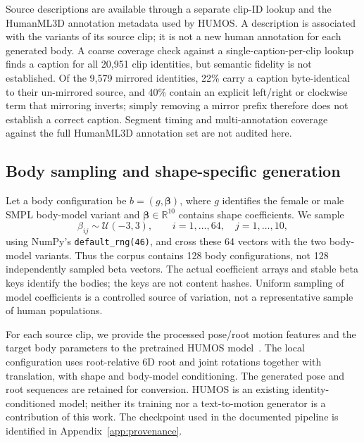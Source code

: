 \documentclass[11pt]{article}
\newcommand{\R}{\mathbb{R}}
\begin{document}
Source descriptions are available through a separate clip-ID lookup and the
HumanML3D annotation metadata used by HUMOS. A description is associated with
the variants of its source clip; it is not a new human annotation for each
generated body. A coarse coverage check against a single-caption-per-clip
lookup finds a caption for all 20,951 clip identities, but semantic fidelity
is not established. Of the 9,579 mirrored identities, 22\% carry a caption
byte-identical to their un-mirrored source, and 40\% contain an explicit
left/right or clockwise term that mirroring inverts; simply removing a mirror
prefix therefore does not establish a correct caption. Segment timing and
multi-annotation coverage against the full HumanML3D annotation set are not
audited here.

\subsection{Body sampling and shape-specific generation}\label{sec:body_generation}

Let a body configuration be $b=(g,\boldsymbol{\beta})$, where $g$ identifies the
female or male SMPL body-model variant and
$\boldsymbol{\beta}\in\R^{10}$ contains shape coefficients. We sample
\begin{equation}
    \beta_{ij}\sim\mathcal{U}(-3,3),\qquad
    i=1,\ldots,64,\quad j=1,\ldots,10,
    \label{eq:shape_sampling}
\end{equation}
using NumPy's \texttt{default\_rng(46)}, and cross these 64 vectors with the two
body-model variants. Thus the corpus contains 128 body configurations, not
128 independently sampled beta vectors. The actual coefficient arrays and
stable beta keys identify the bodies; the keys are not content hashes.
Uniform sampling of model coefficients is a controlled source of variation,
not a representative sample of human populations.

For each source clip, we provide the processed pose/root motion features and
the target body parameters to the pretrained HUMOS
model~\cite{humos}. The local configuration uses root-relative 6D root and
joint rotations together with translation, with shape and body-model
conditioning. The generated pose and root sequences are retained for
conversion. HUMOS is an existing identity-conditioned model; neither its
training nor a text-to-motion generator is a contribution of this work.
The checkpoint used in the documented pipeline is identified in
Appendix~\ref{app:provenance}.
\end{document}
